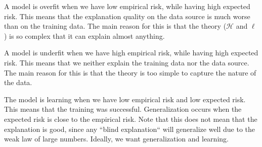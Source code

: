 A model is overfit when we have low empirical risk, while having high expected risk. This means
that the explanation quality on the data source is much worse than on the training data. The main
reason for this is that the theory ($\mathcal{H}$ and $\ell$) is so complex that it can explain
almost anything.

A model is underfit when we have high empirical risk, while having high expected risk. This means
that we neither explain the training data nor the data source. The main reason for this is that the
theory is too simple to capture the nature of the data.

The model is learning when we have low empirical risk and low expected risk. This means that the
training was successful. Generalization occurs when the expected risk is close to the empirical
risk. Note that this does not mean that the explanation is good, since any ``blind explanation``
will generalize well due to the weak law of large numbers. Ideally, we want generalization and
learning.
